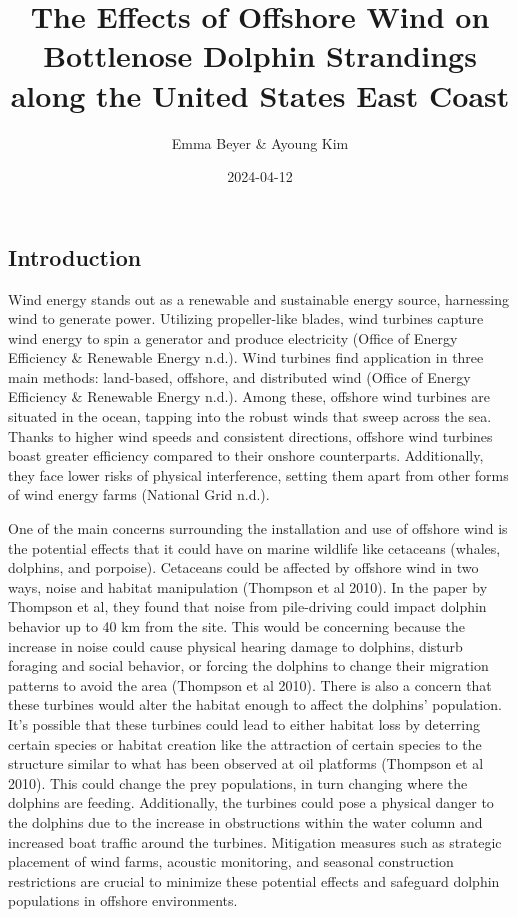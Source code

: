 \documentclass[
]{article}
\title{The Effects of Offshore Wind on Bottlenose Dolphin Strandings
along the United States East Coast}
\author{Emma Beyer \& Ayoung Kim}
\date{2024-04-12}
\begin{document}
\maketitle

\hypertarget{introduction}{%
\subsection{Introduction}\label{introduction}}

Wind energy stands out as a renewable and sustainable energy source,
harnessing wind to generate power. Utilizing propeller-like blades, wind
turbines capture wind energy to spin a generator and produce electricity
(Office of Energy Efficiency \& Renewable Energy n.d.). Wind turbines
find application in three main methods: land-based, offshore, and
distributed wind (Office of Energy Efficiency \& Renewable Energy n.d.).
Among these, offshore wind turbines are situated in the ocean, tapping
into the robust winds that sweep across the sea. Thanks to higher wind
speeds and consistent directions, offshore wind turbines boast greater
efficiency compared to their onshore counterparts. Additionally, they
face lower risks of physical interference, setting them apart from other
forms of wind energy farms (National Grid n.d.).

One of the main concerns surrounding the installation and use of
offshore wind is the potential effects that it could have on marine
wildlife like cetaceans (whales, dolphins, and porpoise). Cetaceans
could be affected by offshore wind in two ways, noise and habitat
manipulation (Thompson et al 2010). In the paper by Thompson et al, they
found that noise from pile-driving could impact dolphin behavior up to
40 km from the site. This would be concerning because the increase in
noise could cause physical hearing damage to dolphins, disturb foraging
and social behavior, or forcing the dolphins to change their migration
patterns to avoid the area (Thompson et al 2010). There is also a
concern that these turbines would alter the habitat enough to affect the
dolphins' population. It's possible that these turbines could lead to
either habitat loss by deterring certain species or habitat creation
like the attraction of certain species to the structure similar to what
has been observed at oil platforms (Thompson et al 2010). This could
change the prey populations, in turn changing where the dolphins are
feeding. Additionally, the turbines could pose a physical danger to the
dolphins due to the increase in obstructions within the water column and
increased boat traffic around the turbines. Mitigation measures such as
strategic placement of wind farms, acoustic monitoring, and seasonal
construction restrictions are crucial to minimize these potential
effects and safeguard dolphin populations in offshore environments.
\end{document}

